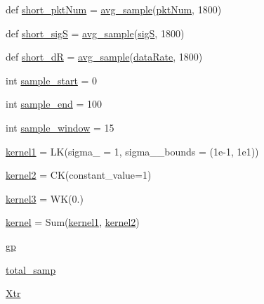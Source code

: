 \begin{DoxyCompactItemize}
\item 
def \mbox{\hyperlink{namespacetime__series2_ab12db667114a1ed12973125874bc16d4}{short\+\_\+pkt\+Num}} = \mbox{\hyperlink{namespacetime__series2_a831b2ebbb3b93f1a189a11b798867bf2}{avg\+\_\+sample}}(\mbox{\hyperlink{namespacetime__series2_ab18c2a5668ac375ae8024899566ec9cb}{pkt\+Num}}, 1800)
\item 
def \mbox{\hyperlink{namespacetime__series2_a606a9c83f25e85d3f3433dc36a593350}{short\+\_\+sigS}} = \mbox{\hyperlink{namespacetime__series2_a831b2ebbb3b93f1a189a11b798867bf2}{avg\+\_\+sample}}(\mbox{\hyperlink{namespacetime__series2_a7f4c741d69814ab642aaeb0d3ba3c6dd}{sigS}}, 1800)
\item 
def \mbox{\hyperlink{namespacetime__series2_a0ca06fc00c13efdb759ffc0a7773bee5}{short\+\_\+dR}} = \mbox{\hyperlink{namespacetime__series2_a831b2ebbb3b93f1a189a11b798867bf2}{avg\+\_\+sample}}(\mbox{\hyperlink{namespacetime__series2_add60d2a933f0e3175a7c67f66e4aca2d}{data\+Rate}}, 1800)
\item 
int \mbox{\hyperlink{namespacetime__series2_a090c1e69b2375fcbd478928c1e306abf}{sample\+\_\+start}} = 0
\item 
int \mbox{\hyperlink{namespacetime__series2_ad170197f80cacfa1a597f0cc81af1ed5}{sample\+\_\+end}} = 100
\item 
int \mbox{\hyperlink{namespacetime__series2_abbcc8a8aa4c18c3850b74368b2728790}{sample\+\_\+window}} = 15
\item 
\mbox{\hyperlink{namespacetime__series2_aa8462353b2fa60dd1b67e2d81b1f53a5}{kernel1}} = LK(sigma\+\_ = 1, sigma\+\_\+\_\+bounds = (1e-\/1, 1e1))
\item 
\mbox{\hyperlink{namespacetime__series2_acf4bc51affffd98b22fcd3442438fff0}{kernel2}} = CK(constant\+\_\+value=1)
\item 
\mbox{\hyperlink{namespacetime__series2_afa3d3c8fdd4d9a88bf7e9e05b4bb806d}{kernel3}} = WK(0.)
\item 
\mbox{\hyperlink{namespacetime__series2_a79d2d803d9f27eb4ed08932199d79a23}{kernel}} = Sum(\mbox{\hyperlink{namespacetime__series2_aa8462353b2fa60dd1b67e2d81b1f53a5}{kernel1}}, \mbox{\hyperlink{namespacetime__series2_acf4bc51affffd98b22fcd3442438fff0}{kernel2}})
\item 
\mbox{\hyperlink{namespacetime__series2_abd0932f2ea87fc90f945a626050ecc14}{gp}}
\item 
\mbox{\hyperlink{namespacetime__series2_af8e48fc6d3d4ad2c551a1b3df864aa51}{total\+\_\+samp}}
\item 
\mbox{\hyperlink{namespacetime__series2_a9ad02e52f2e578dff25a50245476fb4d}{Xtr}}

\end{DoxyCompactItemize}
